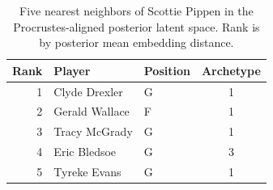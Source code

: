 \begin{table}[htbp]
  \centering\small
  \begin{tabular}{rllc}
    \toprule
    Rank & Player & Position & Archetype \\
    \midrule
    1 & Clyde Drexler & G & 1 \\
    2 & Gerald Wallace & F & 1 \\
    3 & Tracy McGrady & G & 1 \\
    4 & Eric Bledsoe & G & 3 \\
    5 & Tyreke Evans & G & 1 \\
    \bottomrule
  \end{tabular}
  \caption{Five nearest neighbors of Scottie Pippen in the Procrustes-aligned posterior latent space. Rank is by posterior mean embedding distance.}
  \label{tab:Scottie_Pippen_neighbors}
\end{table}

